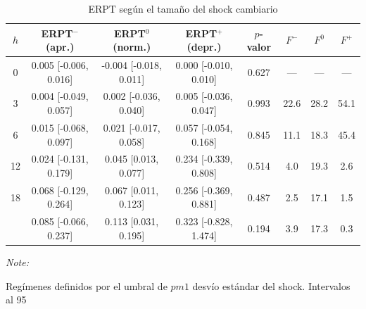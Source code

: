 \begin{table}[!h]
\centering
\caption{ERPT según el tamaño del shock cambiario}
\centering
\fontsize{8}{10}\selectfont
\begin{threeparttable}
\begin{tabular}[t]{cccccccc}
\toprule
$h$ & ERPT$^{-}$ (apr.) & ERPT$^{0}$ (norm.) & ERPT$^{+}$ (depr.) & $p$-valor & $F^{-}$ & $F^{0}$ & $F^{+}$\\
\midrule
0 & 0.005 [-0.006, 0.016] & -0.004 [-0.018, 0.011] & 0.000 [-0.010, 0.010] & 0.627 & --- & --- & ---\\
3 & 0.004 [-0.049, 0.057] & 0.002 [-0.036, 0.040] & 0.005 [-0.036, 0.047] & 0.993 & 22.6 & 28.2 & 54.1\\
6 & 0.015 [-0.068, 0.097] & 0.021 [-0.017, 0.058] & 0.057 [-0.054, 0.168] & 0.845 & 11.1 & 18.3 & 45.4\\
12 & 0.024 [-0.131, 0.179] & 0.045 [0.013, 0.077] & 0.234 [-0.339, 0.808] & 0.514 & 4.0 & 19.3 & 2.6\\
18 & 0.068 [-0.129, 0.264] & 0.067 [0.011, 0.123] & 0.256 [-0.369, 0.881] & 0.487 & 2.5 & 17.1 & 1.5\\
\addlinespace
24 & 0.085 [-0.066, 0.237] & 0.113 [0.031, 0.195] & 0.323 [-0.828, 1.474] & 0.194 & 3.9 & 17.3 & 0.3\\
\bottomrule
\end{tabular}
\begin{tablenotes}
\item \textit{Note: } 
\item Regímenes definidos por el umbral de $pm 1$ desvío estándar del shock. Intervalos al 95%
\end{tablenotes}
\end{threeparttable}
\end{table}